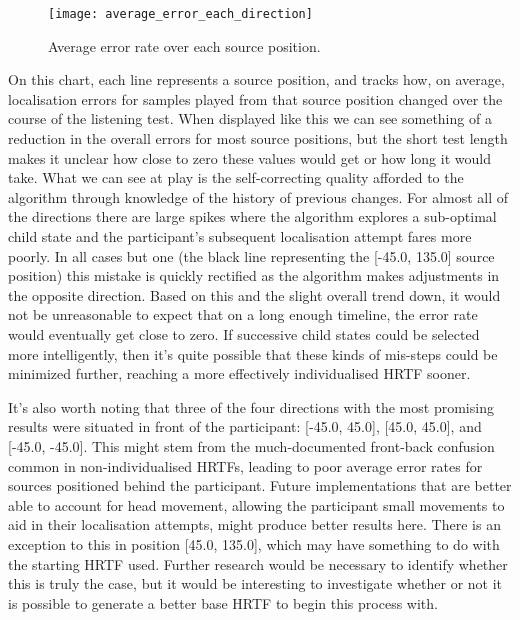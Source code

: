 \begin{figure}
	\caption{Average error rate over each source position.}
	\centering
		\texttt{[image: average\_error\_each\_direction]}
	
\end{figure}

On this chart, each line represents a source position, and tracks how, on average, localisation errors for samples played from that source position changed over the course of the listening test. When displayed like this we can see something of a reduction in the overall errors for most source positions, but the short test length makes it unclear how close to zero these values would get or how long it would take. What we can see at play is the self-correcting quality afforded to the algorithm through knowledge of the history of previous changes. For almost all of the directions there are large spikes where the algorithm explores a sub-optimal child state and the participant's subsequent localisation attempt fares more poorly. In all cases but one (the black line representing the [-45.0, 135.0] source position) this mistake is quickly rectified as the algorithm makes adjustments in the opposite direction. Based on this and the slight overall trend down, it would not be unreasonable to expect that on a long enough timeline, the error rate would eventually get close to zero. If successive child states could be selected more intelligently, then it's quite possible that these kinds of mis-steps could be minimized further, reaching a more effectively individualised HRTF sooner.

It's also worth noting that three of the four directions with the most promising results were situated in front of the participant: [-45.0, 45.0], [45.0, 45.0], and [-45.0, -45.0]. This might stem from the much-documented front-back confusion common in non-individualised HRTFs, leading to poor average error rates for sources positioned behind the participant. Future implementations that are better able to account for head movement, allowing the participant small movements to aid in their localisation attempts, might produce better results here. There is an exception to this in position [45.0, 135.0], which may have something to do with the starting HRTF used. Further research would be necessary to identify whether this is truly the case, but it would be interesting to investigate whether or not it is possible to generate a better base HRTF to begin this process with.

